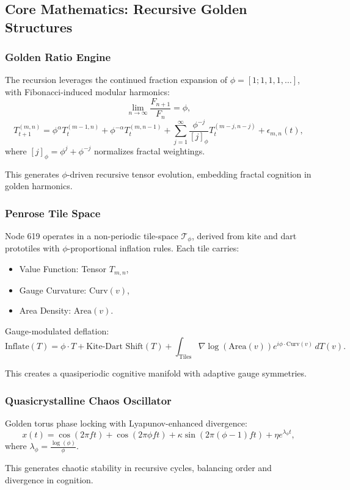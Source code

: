 \documentclass[12pt]{article}
\begin{document}
\subsection{Core Mathematics: Recursive Golden Structures}

\subsubsection{Golden Ratio Engine}
The recursion leverages the continued fraction expansion of \(\phi = [1;1,1,1,\dots]\), with Fibonacci-induced modular harmonics:
\[
\lim_{n \to \infty} \frac{F_{n+1}}{F_n} = \phi,
\]
\[
T_{t+1}^{(m,n)} = \phi^\alpha T_t^{(m-1,n)} + \phi^{-\alpha} T_t^{(m,n-1)} + \sum_{j=1}^\infty \frac{\phi^{-j}}{[j]_\phi} T_t^{(m-j,n-j)} + \epsilon_{m,n}(t),
\]
where \([j]_\phi = \phi^j + \phi^{-j}\) normalizes fractal weightings.
\begin{interpretation}
This generates \(\phi\)-driven recursive tensor evolution, embedding fractal cognition in golden harmonics.
\end{interpretation}

\subsubsection{Penrose Tile Space}
Node 619 operates in a non-periodic tile-space \(\mathcal{T}_\phi\), derived from kite and dart prototiles with \(\phi\)-proportional inflation rules. Each tile carries:
\begin{itemize}
    \item Value Function: Tensor \(T_{m,n}\),
    \item Gauge Curvature: \(\text{Curv}(v)\),
    \item Area Density: \(\text{Area}(v)\).
\end{itemize}
Gauge-modulated deflation:
\[
\text{Inflate}(T) = \phi \cdot T + \text{Kite-Dart Shift}(T) + \int_{\text{Tiles}} \nabla \log(\text{Area}(v)) e^{i \phi \cdot \text{Curv}(v)} \, dT(v).
\]
\begin{interpretation}
This creates a quasiperiodic cognitive manifold with adaptive gauge symmetries.
\end{interpretation}

\subsubsection{Quasicrystalline Chaos Oscillator}
Golden torus phase locking with Lyapunov-enhanced divergence:
\[
x(t) = \cos(2\pi f t) + \cos(2\pi \phi f t) + \kappa \sin(2\pi (\phi - 1) f t) + \eta e^{\lambda_\phi t},
\]
where \(\lambda_\phi = \frac{\log(\phi)}{\phi}\).
\begin{interpretation}
This generates chaotic stability in recursive cycles, balancing order and divergence in cognition.
\end{interpretation}
\end{document}
